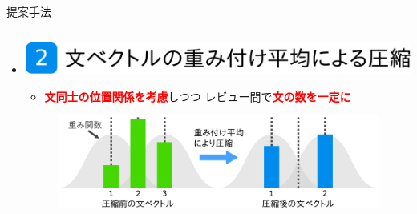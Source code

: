 \documentclass[unicode,10pt]{beamer}
\newlength{\mycolumnwidth}
\newlength{\mytitlefigureheight}
\newcommand{\itemtitle}[1]{\textbf{#1}\\}
\newcommand{\fire}[1]{\textcolor{red}{\textbf{#1}}}
\newcommand{\doublecolumns}[4]{
    \begin{minipage}[t]{#1}
      #2
    \end{minipage}
    \begin{minipage}[t]{#3}
      #4
    \end{minipage}}
\begin{document}
\begin{frame}[t]
\begin{block}{提案手法}
\begin{columns}[onlytextwidth,t]
    \begin{column}{\mycolumnwidth}
      \begin{itemize}
        \item \itemtitle{\includegraphics[height=\mytitlefigureheight]
                                         {fig/poster_model_title_2.pdf}}
          \begin{itemize}
            \item \fire{文同士の位置関係を考慮}しつつ
                  レビュー間で\fire{文の数を一定に}
          \end{itemize}
          \begin{figure}
            \includegraphics[width=\linewidth]
                            {fig/what_are_you_weighting_for.pdf}
          \end{figure}

\end{itemize}
\end{column}
\end{columns}
\end{block}
\end{frame}
\end{document}
